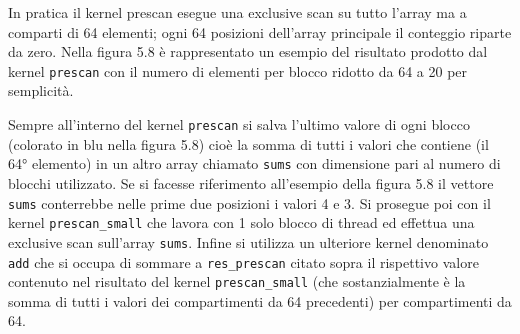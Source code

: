 \documentclass[12pt,a4paper]{report}
\begin{document}
 In pratica il kernel prescan esegue una exclusive scan su tutto l’array ma a comparti di 64 elementi; ogni 64 posizioni dell’array principale il conteggio riparte da zero. \newline 
Nella figura 5.8 è rappresentato un esempio del risultato prodotto dal kernel \verb|prescan| con il numero di elementi per blocco ridotto da 64 a 20 per semplicità.
\begin{figure}[H]
\centering
\begin{floatrow}[1]
\end{floatrow}
\end{figure} 
Sempre all’interno del kernel \verb|prescan| si salva l’ultimo valore di ogni blocco (colorato in blu nella figura 5.8) cioè la somma di tutti i valori che contiene (il 64° elemento) in un altro array chiamato \verb|sums| con dimensione pari al numero di blocchi utilizzato. Se si facesse riferimento all'esempio della figura 5.8 il vettore \verb|sums| conterrebbe nelle prime due posizioni i valori 4 e 3.
Si prosegue poi con il kernel \verb|prescan_small| che lavora con 1 solo blocco di thread ed effettua una exclusive scan sull’array \verb|sums|.
Infine si utilizza un ulteriore kernel denominato \verb|add| che si occupa di sommare a \verb|res_prescan| citato sopra il rispettivo valore contenuto nel risultato del kernel \verb|prescan_small| (che sostanzialmente è la somma di tutti i valori dei compartimenti da 64 precedenti) per compartimenti da 64. \newpage
\end{document}
